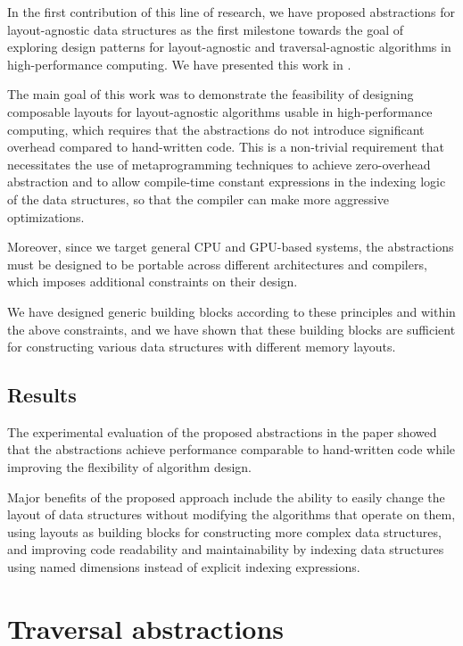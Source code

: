 In the first contribution of this line of research, we have proposed abstractions for layout-agnostic data structures as the first milestone towards the goal of exploring design patterns for layout-agnostic and traversal-agnostic algorithms in high-performance computing. We have presented this work in .

The main goal of this work was to demonstrate the feasibility of designing composable layouts for layout-agnostic algorithms usable in high-performance computing, which requires that the abstractions do not introduce significant overhead compared to hand-written code. This is a non-trivial requirement that necessitates the use of metaprogramming techniques to achieve zero-overhead abstraction and to allow compile-time constant expressions in the indexing logic of the data structures, so that the compiler can make more aggressive optimizations.

Moreover, since we target general CPU and GPU-based systems, the abstractions must be designed to be portable across different architectures and compilers, which imposes additional constraints on their design.

We have designed generic building blocks according to these principles and within the above constraints, and we have shown that these building blocks are sufficient for constructing various data structures with different memory layouts.


\subsection{Results}\label{sec:astute-results}

The experimental evaluation of the proposed abstractions in the paper showed that the abstractions achieve performance comparable to hand-written code while improving the flexibility of algorithm design.

Major benefits of the proposed approach include the ability to easily change the layout of data structures without modifying the algorithms that operate on them, using layouts as building blocks for constructing more complex data structures, and improving code readability and maintainability by indexing data structures using named dimensions instead of explicit indexing expressions.


\section{Traversal abstractions}\label{sec:pure-cpp-approach}

